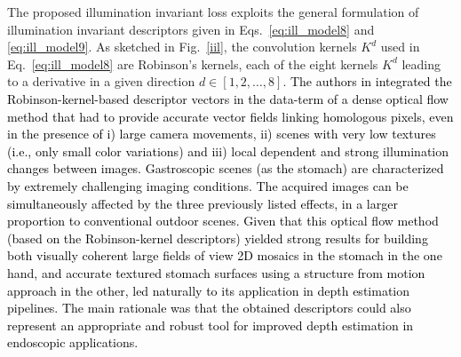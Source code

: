 \documentclass[a4paper,fleqn]{cas-dc}
\begin{document}
\vspace*{1 mm}
 The proposed illumination invariant loss exploits the general formulation of illumination invariant descriptors given in Eqs.~\eqref{eq:ill_model8} and \eqref{eq:ill_model9}. As sketched in Fig.~\ref{iil}, the convolution kernels $K^d$ used in Eq.~\eqref{eq:ill_model8} are Robinson's kernels, each of the eight kernels $K^d$ leading to a derivative in a given direction $d \in [1, 2, \ldots, 8]$. \textcolor{black}{The authors in  \citep{Trinh_CVIU_2019} integrated the Robinson-kernel-based descriptor vectors in the data-term of a dense optical flow method that had to provide accurate vector fields linking homologous pixels, even in the presence of i) large camera movements, ii) scenes with very low textures (i.e., only small color variations) and iii) local dependent and strong  illumination changes between images. Gastroscopic scenes (as the stomach) are characterized by extremely challenging imaging conditions. The acquired images can be simultaneously affected by the three previously listed effects, in a larger proportion to conventional outdoor scenes. Given  that this optical flow method (based on the Robinson-kernel descriptors) yielded strong results for building  both visually coherent large fields of view 2D mosaics in the stomach \citep{Zenteno_CBM_2022} in the one hand, and accurate textured stomach surfaces using a structure from motion approach \citep{Phan_PR_2020} in the other, led naturally to its application in depth estimation pipelines. The main rationale was that the obtained descriptors could also represent an appropriate and robust tool for improved depth estimation in endoscopic applications.}
\end{document}
